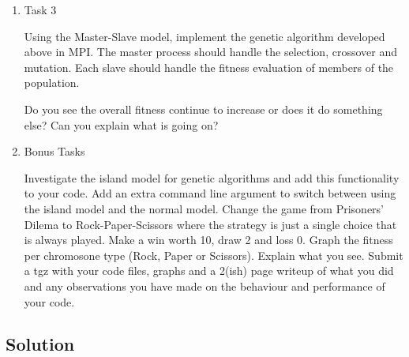 \documentclass[paper=a4, fontsize=11pt]{scrartcl} %
\numberwithin{equation}{section} %
\numberwithin{figure}{section} %
\numberwithin{table}{section} %
\begin{document}
\begin{enumerate}
\item{Task 3}

Using the Master-Slave model, implement the genetic algorithm developed above in MPI. The master process should handle the selection, crossover and mutation. Each slave should handle the fitness evaluation of members of the population.

Do you see the overall fitness continue to increase or does it do something else? Can you explain what is going on?

\item{Bonus Tasks}

Investigate the island model for genetic algorithms and add this functionality to your code. Add an extra command line argument to switch between using the island model and the normal model.
Change the game from Prisoners' Dilema to Rock-Paper-Scissors where the strategy is just a single choice that is always played. Make a win worth 10, draw 2 and loss 0. Graph the fitness per chromosone type (Rock, Paper or Scissors). Explain what you see.
Submit a tgz with your code files, graphs and a 2(ish) page writeup of what you did and any observations you have made on the behaviour and performance of your code.

\end{enumerate}

\newpage


\begin{comment}

USEFUL LINKS:

official sources for terminology:
-----
http://www.intel.com/content/www/us/en/support/topics/glossary.html
https://www-01.ibm.com/software/globalization/terminology/a.html
-----




about IMB processors:
-----

insert in google: list of ibm processors
https://en.wikipedia.org/wiki/List_of_IBM_products
https://www-01.ibm.com/software/passportadvantage/guide_to_identifying_processor_family.html
http://www.nextplatform.com/2015/08/10/ibm-roadmap-extends-power-chips-to-2020-and-beyond/
http://www.theverge.com/2015/7/9/8919091/ibm-7nm-transistor-processor
https://www.ibm.com/developerworks/ibmi/library/i-ibmi-7_2-and-ibm-power8/
-----




\end{comment}


\subsection{Solution}
\end{document}
